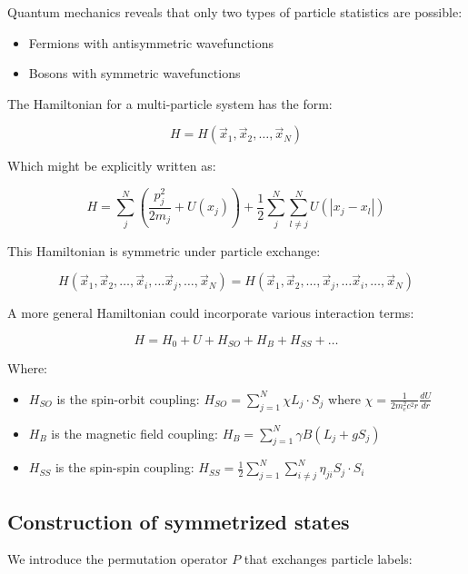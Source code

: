 \documentclass[italian]{HKNdocument}
\begin{document}
Quantum mechanics reveals that only two types of particle statistics are possible:
\begin{itemize}
  \item Fermions with antisymmetric wavefunctions
  \item Bosons with symmetric wavefunctions
\end{itemize}

The Hamiltonian for a multi-particle system has the form:

\begin{equation}
H=H(\vec{x}_1,\vec{x}_2,\ldots,\vec{x}_N)
\end{equation}

Which might be explicitly written as:

\begin{equation}
H=\sum_{j}^{N}(\frac{p_j^2}{2m_j}+U(x_j))+\frac{1}{2}\sum_{j}^{N}\sum_{l\neq j}^{N}U(|x_j-x_l|)
\end{equation}

This Hamiltonian is symmetric under particle exchange:

\begin{equation}
H(\vec{x}_1,\vec{x}_2,\ldots,\vec{x}_i,\ldots\vec{x}_j,\ldots,\vec{x}_N)=H(\vec{x}_1,\vec{x}_2,\ldots,\vec{x}_j,\ldots\vec{x}_i,\ldots,\vec{x}_N)
\end{equation}


A more general Hamiltonian could incorporate various interaction terms:

\begin{equation}
H=H_0+U+H_{SO}+H_B+H_{SS}+\ldots
\end{equation}

Where:
\begin{itemize}
  \item $H_{SO}$ is the spin-orbit coupling: $H_{SO}=\sum_{j=1}^{N}\chi L_j\cdot S_j$ where $\chi=\frac{1}{2m_e^2c^2r}\frac{dU}{dr}$
  \item $H_B$ is the magnetic field coupling: $H_B=\sum_{j=1}^{N}\gamma B(L_j+gS_j)$
  \item $H_{SS}$ is the spin-spin coupling: $H_{SS}=\frac{1}{2}\sum_{j=1}^{N}\sum_{i\neq j}^{N}\eta_{ji}S_j\cdot S_i$
\end{itemize}

\subsection{Construction of symmetrized states}
We introduce the permutation operator $P$ that exchanges particle labels:
\end{document}
